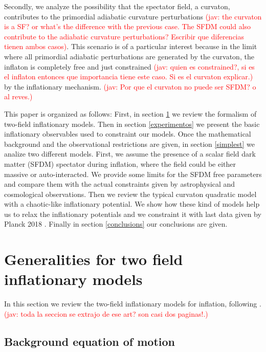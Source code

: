 \documentclass[amssymb,twocolumn,prd,nofootinbib,showpacs]{revtex4-1}
\newcommand{\jav}[1]{\textcolor{red}{(jav: #1)}}
\begin{document}
Secondly, we analyze the possibility that the spectator field, a curvaton, contributes to the primordial adiabatic curvature 
perturbations \cite{curv1,curv2,curv3} \jav{the curvaton is a SF? or what's the difference with the previous case. The SFDM could
also contribute to the adiabatic curvature perturbations?  Escribir que diferencias tienen ambos casos}. 
This scenario is of a particular interest because in the limit where all primordial adiabatic 
perturbations are generated by the curvaton, the inflaton is completely free and just constrained \jav{quien es constrained?, si es el
inflaton entonces que importancia tiene este caso. Si es el curvaton explicar.} 
by the inflationary mechanism.
\jav{Por que el curvaton no puede ser SFDM? o al reves.}

This paper is organized as follows: First, in section \ref{Generalities} we review the formalism of two-field inflationary models. 
Then in section \ref{experimentos} we present the basic inflationary observables used to constraint our models. 
Once the mathematical background and the observational restrictions are given, in section \ref{simplest} we analize two different models. 
First, we assume the presence of a scalar field dark matter (SFDM) spectator during inflation, where the  
 field could be either massive or auto-interacted. We provide some limits for the SFDM free parameters and 
 compare them with the actual constraints given by astrophysical and cosmological observations. 
 Then we review the typical curvaton quadratic model with a chaotic-like inflationary potential. We show how these 
 kind of models help us to relax the inflationary potentials and we constraint it with last data given by Planck 2018 \cite{planck}. 
 Finally in section \ref{conclusions} our conclusions are given.      

\section{Generalities for two field inflationary models}\label{Generalities}


In this section we review the two-field inflationary models for inflation, following \cite{twofields}. 
\jav{toda la seccion se extrajo de ese art? son casi dos paginas!.}
%
\subsection{Background equation of motion}
\end{document}
